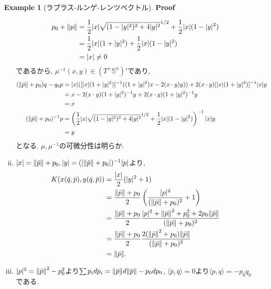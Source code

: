 \documentclass[a4paper]{ujarticle}
\makeatletter
\numberwithin{equation}{section}
\theoremstyle{definition}
\newtheorem{example}{Example}
\renewenvironment{proof}[1][Proof]{\par
  \pushQED{\qed}%
  \normalfont \topsep6\p@\@plus6\p@\relax
  \trivlist
  \item\relax
  {\bfseries
  #1\@addpunct{.}}\hspace\labelsep\ignorespaces
}{%
  \popQED\endtrivlist\@endpefalse
}
\makeatother
\begin{document}
\begin{example}[ラプラス-ルンゲ-レンツベクトル]
\begin{proof}
\begin{enumerate}[(i)]
\begin{align}
                        p_0 + \norm{p} &= \frac{1}{2}|x|\sqrt{(1 - |y|^2)^2 + 4 |y|^2}^{1/2} + \frac{1}{2}|x|(1 - |y|^2) \\
                        &= \frac{1}{2}|x|(1 + |y|^2) + \frac{1}{2}|x|(1 - |y|^2) \\
                        &= |x| \neq 0
                    \end{align}
                    であるから, $\mu^{-1}(x, y) \in (T^{+} \mathbb{S}^{n})'$であり, 
                    \begin{align}
                        (\norm{\bar{p}} + p_0) q - q_0 p &= |x|([|x|(1 + |y|^2)]^{-1}((1 + |y|^2)x - 2 (x \cdot y) y)) + 2 (x \cdot y)[|x|(1 + |y|^2)]^{-1} |x|y \\
                        &= x - 2 (x \cdot y)(1 + |y|^2)^{-1} y + 2 (x \cdot y)(1 + |y|^2)^{-1} y \\
                        &= x \\
                        (\norm{\bar{p}} + p_0)^{-1} p &= \left(\frac{1}{2}|x|\sqrt{(1 - |y|^2)^2 + 4 |y|^2}^{1/2} + \frac{1}{2}|x|(1 - |y|^2)\right)^{-1} |x|y \\
                        &= y
                    \end{align}
                    となる. $\mu, \mu^{-1}$の可微分性は明らか.
                    \item $|x| = \norm{\bar{p}} + p_0, |y| = (|\norm{\bar{p}} + p_0|)^{-1}|p|$より, 
                    \begin{align}
                        K(x(\bar{q}, \bar{p}), y(\bar{q}, \bar{p})) &= \frac{|x|}{2}(|y|^2 + 1)\\
                        &= \frac{\norm{\bar{p}} + p_0}{2}\left(\frac{|p|^2}{(\norm{\bar{p}} + p_0)^2} + 1\right) \\
                        &= \frac{\norm{\bar{p}} + p_0}{2} \frac{|p|^2 + \norm{\bar{p}}^2 + p_0^2 + 2 p_0 \norm{\bar{p}}}{(\norm{\bar{p}} + p_0)^2} \\
                        &= \frac{\norm{\bar{p}} + p_0}{2} \frac{2 (\norm{\bar{p}}^2 + p_0 ) \norm{\bar{p}}}{(\norm{\bar{p}} + p_0)^2} \\
                        &= \norm{\bar{p}}.
                    \end{align}
                    \item $|p|^2 = \norm{\bar{p}}^2 - p_0^2$より$\sum p_i d p_i = \norm{\bar{p}} d \norm{\bar{p}} - p_0 d p_0$, 
                    $\langle \bar{p}, \bar{q}\rangle = 0$より$\langle p, q\rangle = - p_0 q_0$ である.

\end{enumerate}
\end{proof}
\end{example}
\end{document}
